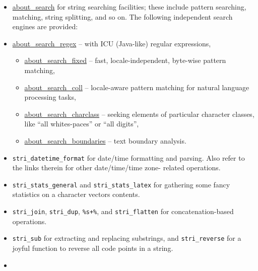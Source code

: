 \documentclass[
]{article}
\begin{document}
\begin{itemize}
\item
  \href{vscode-webview://00i87qrgljff0t3jmc9gjufilst9usetvkh9gn773om0ic67o1j2/stringi/help/about_search}{about\_search}
  for string searching facilities; these include pattern searching,
  matching, string splitting, and so on. The following independent
  search engines are provided:
\item
  \href{vscode-webview://00i87qrgljff0t3jmc9gjufilst9usetvkh9gn773om0ic67o1j2/stringi/help/about_search_regex}{about\_search\_regex}
  -- with ICU (Java-like) regular expressions,

  \begin{itemize}
  \item
    \href{vscode-webview://00i87qrgljff0t3jmc9gjufilst9usetvkh9gn773om0ic67o1j2/stringi/help/about_search_fixed}{about\_search\_fixed}
    -- fast, locale-independent, byte-wise pattern matching,
  \item
    \href{vscode-webview://00i87qrgljff0t3jmc9gjufilst9usetvkh9gn773om0ic67o1j2/stringi/help/about_search_coll}{about\_search\_coll}
    -- locale-aware pattern matching for natural language processing
    tasks,
  \item
    \href{vscode-webview://00i87qrgljff0t3jmc9gjufilst9usetvkh9gn773om0ic67o1j2/stringi/help/about_search_charclass}{about\_search\_charclass}
    -- seeking elements of particular character classes, like ``all
    whites-paces'' or ``all digits'',
  \item
    \href{vscode-webview://00i87qrgljff0t3jmc9gjufilst9usetvkh9gn773om0ic67o1j2/stringi/help/about_search_boundaries}{about\_search\_boundaries}
    -- text boundary analysis.
  \end{itemize}
\item
  \texttt{stri\_datetime\_format} for date/time formatting and parsing.
  Also refer to the links therein for other date/time/time zone- related
  operations.
\item
  \texttt{stri\_stats\_general} and \texttt{stri\_stats\_latex} for
  gathering some fancy statistics on a character
  vector\textquotesingle s contents.
\item
  \texttt{stri\_join}, \texttt{stri\_dup}, \texttt{\%s+\%}, and
  \texttt{stri\_flatten} for concatenation-based operations.
\item
  \texttt{stri\_sub} for extracting and replacing substrings, and
  \texttt{stri\_reverse} for a joyful function to reverse all code
  points in a string.
\item

\end{itemize}
\end{document}
